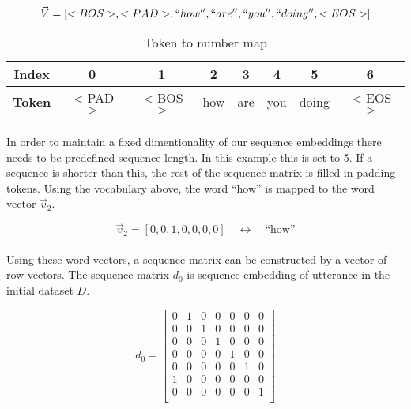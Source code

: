 \documentclass{article}
\begin{document}
\begin{equation}
   \vec{V} = [<BOS>, <PAD>, ``how'', ``are'', ``you'', ``doing'', <EOS>]
 \end{equation}

\begin{table}[hbt]
  \begin{center}
    \begin{tabular}{c|c|c|c|c|c|c|c}
      \textbf{Index} & 0 & 1 & 2 & 3 & 4 & 5 & 6\\
      \hline
      \textbf{Token} & $<$PAD$>$ & $<$BOS$>$ & how & are & you & doing & $<$EOS$>$\\
    \end{tabular}
  \end{center}
  \label{tab:tok2num}
  \caption{Token to number map}
\end{table}

\paragraph{}
In order to maintain a fixed dimentionality of our sequence embeddings there
needs to be predefined sequence length. In this example this is set to 5. If a
sequence is shorter than this, the rest of the sequence matrix is filled in
padding tokens. Using the vocabulary above, the word ``how'' is mapped to the
word vector $\vec{v}_2$.

\begin{equation}
  \vec{v}_2 = [0, 0, 1, 0, 0, 0, 0] \quad {\leftrightarrow} \quad \textrm{``how''}
\end{equation}

\paragraph{}
Using these word vectors, a sequence matrix can be constructed by a vector of
row vectors. The sequence matrix $d_0$ is sequence embedding of utterance in
the initial dataset $D$.

\begin{equation}
  d_{0} = 
    \begin{bmatrix}
      0 & 1 & 0 & 0 & 0 & 0 & 0\\
      0 & 0 & 1 & 0 & 0 & 0 & 0\\
      0 & 0 & 0 & 1 & 0 & 0 & 0\\
      0 & 0 & 0 & 0 & 1 & 0 & 0\\
      0 & 0 & 0 & 0 & 0 & 1 & 0\\
      1 & 0 & 0 & 0 & 0 & 0 & 0\\
      0 & 0 & 0 & 0 & 0 & 0 & 1\\
    \end{bmatrix}
\end{equation}
\end{document}
